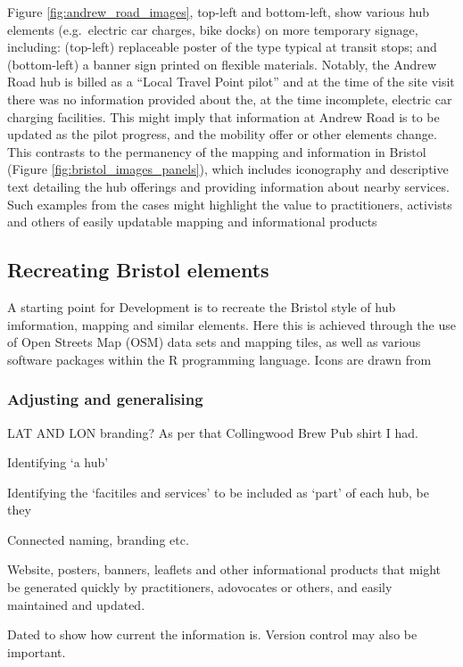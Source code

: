 \documentclass[preprint, 3p,
authoryear]{elsarticle} %
\begin{document}
Figure \ref{fig:andrew_road_images}, top-left and bottom-left, show
various hub elements (e.g.~electric car charges, bike docks) on more
temporary signage, including: (top-left) replaceable poster of the type
typical at transit stops; and (bottom-left) a banner sign printed on
flexible materials. Notably, the Andrew Road hub is billed as a ``Local
Travel Point pilot'' and at the time of the site visit there was no
information provided about the, at the time incomplete, electric car
charging facilities. This might imply that information at Andrew Road is
to be updated as the pilot progress, and the mobility offer or other
elements change. This contrasts to the permanency of the mapping and
information in Bristol (Figure \ref{fig:bristol_images_panels}), which
includes iconography and descriptive text detailing the hub offerings
and providing information about nearby services. Such examples from the
cases might highlight the value to practitioners, activists and others
of easily updatable mapping and informational products

\subsection{Recreating Bristol
elements}\label{recreating-bristol-elements}

A starting point for Development is to recreate the Bristol style of hub
imformation, mapping and similar elements. Here this is achieved through
the use of Open Streets Map (OSM) data sets and mapping tiles, as well
as various software packages within the R programming language. Icons
are drawn from \cite{Pousson:2022aa}

\subsubsection{Adjusting and
generalising}\label{adjusting-and-generalising}

LAT AND LON branding? As per that Collingwood Brew Pub shirt I had.

Identifying `a hub'

Identifying the `facitiles and services' to be included as `part' of
each hub, be they

Connected naming, branding etc.

Website, posters, banners, leaflets and other informational products
that might be generated quickly by practitioners, adovocates or others,
and easily maintained and updated.

Dated to show how current the information is. Version control may also
be important.
\end{document}

